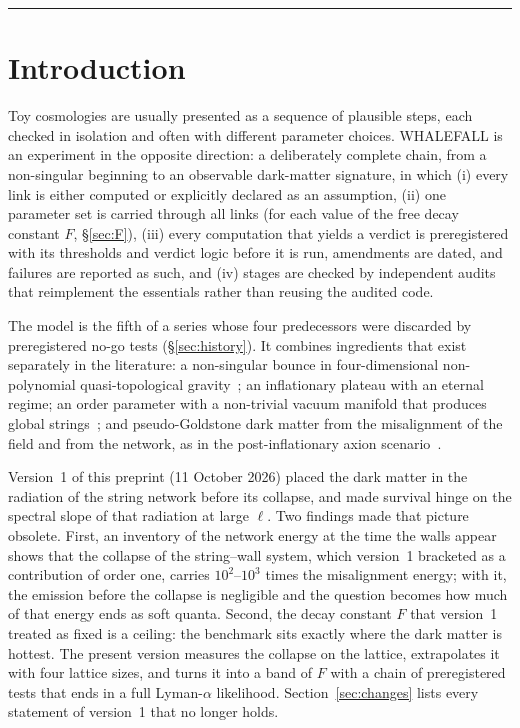 \documentclass[11pt,a4paper]{article}
\begin{document}
\clearpage
\tableofcontents
\bigskip\hrule\bigskip

\section{Introduction}

Toy cosmologies are usually presented as a sequence of plausible steps, each checked in isolation and often with different parameter choices.
WHALEFALL is an experiment in the opposite direction: a deliberately complete chain, from a non-singular beginning to an observable dark-matter signature, in which
(i) every link is either computed or explicitly declared as an assumption,
(ii) one parameter set is carried through all links (for each value of the free decay constant $F$, \S\ref{sec:F}),
(iii) every computation that yields a verdict is preregistered with its thresholds and verdict logic before it is run, amendments are dated, and failures are reported as such, and
(iv) stages are checked by independent audits that reimplement the essentials rather than reusing the audited code.

The model is the fifth of a series whose four predecessors were discarded by preregistered no-go tests (\S\ref{sec:history}).
It combines ingredients that exist separately in the literature: a non-singular bounce in four-dimensional non-polynomial quasi-topological gravity~\cite{Bueno2025formation,BorissovaMagueijo2026}; an inflationary plateau with an eternal regime; an order parameter with a non-trivial vacuum manifold that produces global strings~\cite{Kibble1976,VilenkinShellard}; and pseudo-Goldstone dark matter from the misalignment of the field and from the network, as in the post-inflationary axion scenario~\cite{GHV2018,GHV2021,Buschmann2022,Hindmarsh2021approach,Saikawa2024,KimParkSon2024,Correia2025spectrum}.

Version~1 of this preprint (11 October 2026) placed the dark matter in the radiation of the string network before its collapse, and made survival hinge on the spectral slope of that radiation at large $\ell$.
Two findings made that picture obsolete.
First, an inventory of the network energy at the time the walls appear shows that the collapse of the string--wall system, which version~1 bracketed as a contribution of order one, carries $10^2$--$10^3$ times the misalignment energy; with it, the emission before the collapse is negligible and the question becomes how much of that energy ends as soft quanta.
Second, the decay constant $F$ that version~1 treated as fixed is a ceiling: the benchmark sits exactly where the dark matter is hottest.
The present version measures the collapse on the lattice, extrapolates it with four lattice sizes, and turns it into a band of $F$ with a chain of preregistered tests that ends in a full Lyman-$\alpha$ likelihood.
Section~\ref{sec:changes} lists every statement of version~1 that no longer holds.
\end{document}
